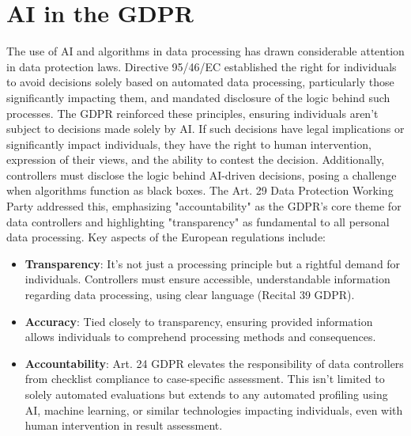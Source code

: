 \section{AI in the GDPR}

The use of AI and algorithms in data processing has drawn considerable attention in data protection laws. Directive 95/46/EC established the right for individuals to avoid decisions solely based on automated data processing, particularly those significantly impacting them, and mandated disclosure of the logic behind such processes.
\newline
The GDPR reinforced these principles, ensuring individuals aren't subject to decisions made solely by AI. If such decisions have legal implications or significantly impact individuals, they have the right to human intervention, expression of their views, and the ability to contest the decision. Additionally, controllers must disclose the logic behind AI-driven decisions, posing a challenge when algorithms function as black boxes.
\newline
The Art. 29 Data Protection Working Party addressed this, emphasizing "accountability" as the GDPR's core theme for data controllers and highlighting "transparency" as fundamental to all personal data processing.
\newline
Key aspects of the European regulations include:

\begin{itemize}
    \item \textbf{Transparency}: It's not just a processing principle but a rightful demand for individuals. Controllers must ensure accessible, understandable information regarding data processing, using clear language (Recital 39 GDPR).
    
    \item \textbf{Accuracy}: Tied closely to transparency, ensuring provided information allows individuals to comprehend processing methods and consequences.
    
    \item \textbf{Accountability}: Art. 24 GDPR elevates the responsibility of data controllers from checklist compliance to case-specific assessment. This isn't limited to solely automated evaluations but extends to any automated profiling using AI, machine learning, or similar technologies impacting individuals, even with human intervention in result assessment.
\end{itemize}

